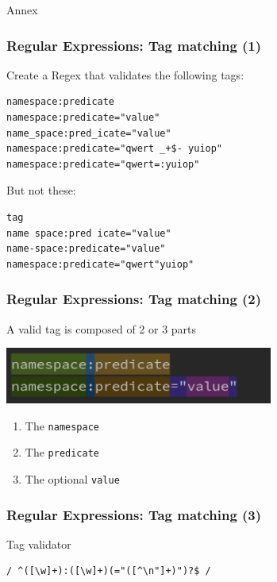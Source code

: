 \documentclass{beamer}
\begin{document}
\begin{frame}
    \vfill
    \centering
    \Huge Annex
    \vfill
\end{frame}

\begin{frame}[fragile]
    \frametitle{Regular Expressions: Tag matching (1)}
    Create a Regex that validates the following tags:
\begin{lstlisting}
namespace:predicate
namespace:predicate="value"
name_space:pred_icate="value"
namespace:predicate="qwert _+$- yuiop"
namespace:predicate="qwert=:yuiop"
\end{lstlisting}
    But not these:
\begin{lstlisting}
tag
name space:pred icate="value"
name-space:predicate="value"
namespace:predicate="qwert"yuiop"
\end{lstlisting}
\end{frame}

\begin{frame}[fragile]
    \frametitle{Regular Expressions: Tag matching (2)}
    A valid tag is composed of 2 or 3 parts
    \begin{center}
        \includegraphics[width=0.66\textwidth]{pics/regex/regex_intro.png}
    \end{center}
    \begin{enumerate}
        \item The \texttt{namespace}
        \item The \texttt{predicate}
        \item The optional \texttt{value}
    \end{enumerate}
\end{frame}

\begin{frame}[fragile]
    \frametitle{Regular Expressions: Tag matching (3)}
    \begin{center}
        Tag validator
    \end{center}
    {
        \Large
        \begin{verbatim}/ ^([\w]+):([\w]+)(="([^\n"]+)")?$ /\end{verbatim}
    }
\end{frame}
\end{document}
